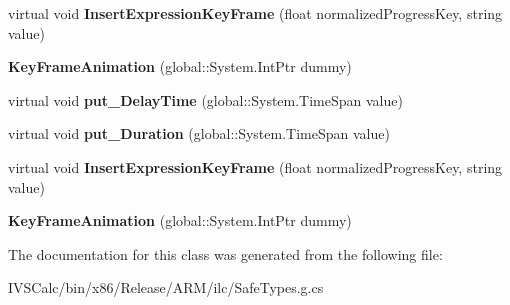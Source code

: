 \begin{DoxyCompactItemize}
\mbox{\label{class_windows_1_1_u_i_1_1_composition_1_1_key_frame_animation_aa9ca1cc7ef8fee48aa80be58f822d74d}} 
virtual void {\bfseries Insert\+Expression\+Key\+Frame} (float normalized\+Progress\+Key, string value)
\item 
\mbox{\label{class_windows_1_1_u_i_1_1_composition_1_1_key_frame_animation_a41ceaa7dc6978478da5356996171bca7}} 
{\bfseries Key\+Frame\+Animation} (global\+::\+System.\+Int\+Ptr dummy)
\item 
\mbox{\label{class_windows_1_1_u_i_1_1_composition_1_1_key_frame_animation_ac62b6652265be62aec74788b234c8dc5}} 
virtual void {\bfseries put\+\_\+\+Delay\+Time} (global\+::\+System.\+Time\+Span value)
\item 
\mbox{\label{class_windows_1_1_u_i_1_1_composition_1_1_key_frame_animation_ac8c63cee562c78b3993f3c3b6ceae431}} 
virtual void {\bfseries put\+\_\+\+Duration} (global\+::\+System.\+Time\+Span value)
\item 
\mbox{\label{class_windows_1_1_u_i_1_1_composition_1_1_key_frame_animation_aa9ca1cc7ef8fee48aa80be58f822d74d}} 
virtual void {\bfseries Insert\+Expression\+Key\+Frame} (float normalized\+Progress\+Key, string value)
\item 
\mbox{\label{class_windows_1_1_u_i_1_1_composition_1_1_key_frame_animation_a41ceaa7dc6978478da5356996171bca7}} 
{\bfseries Key\+Frame\+Animation} (global\+::\+System.\+Int\+Ptr dummy)
\end{DoxyCompactItemize}


The documentation for this class was generated from the following file\+:\begin{DoxyCompactItemize}
\item 
I\+V\+S\+Calc/bin/x86/\+Release/\+A\+R\+M/ilc/Safe\+Types.\+g.\+cs\end{DoxyCompactItemize}
